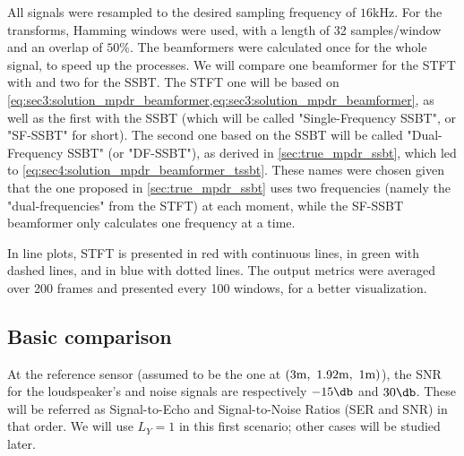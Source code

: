 All signals were resampled to the desired sampling frequency of $16\si{\kilo\hertz}$. For the transforms, Hamming windows were used, with a length of 32 samples/window and an overlap of $50\%$. The beamformers were calculated once for the whole signal, to speed up the processes. We will compare one beamformer for the STFT with and two for the SSBT. The STFT one will be based on \cref{eq:sec3:solution_mpdr_beamformer,eq:sec3:solution_mpdr_beamformer}, as well as the first with the SSBT (which will be called "Single-Frequency SSBT", or "SF-SSBT" for short). The second one based on the SSBT will be called "Dual-Frequency SSBT" (or "DF-SSBT"), as derived in \cref{sec:true_mpdr_ssbt}, which led to \cref{eq:sec4:solution_mpdr_beamformer_tssbt}. These names were chosen given that the one proposed in \cref{sec:true_mpdr_ssbt} uses two frequencies (namely the "dual-frequencies" from the STFT) at each moment, while the SF-SSBT beamformer only calculates one frequency at a time.

In line plots, STFT is presented in red with continuous lines, \nssbt{} in green with dashed lines, and \tssbt{} in blue with dotted lines. The output metrics were averaged over 200 frames and presented every 100 windows, for a better visualization.
%

\subsection{Basic comparison}
At the reference sensor (assumed to be the one at $(3\si{\meter},~1.92\si{\meter},~1\si{\meter})$), the SNR for the loudspeaker's and noise signals are respectively $-15\dB$ and $30\dB$. These will be referred as Signal-to-Echo and Signal-to-Noise Ratios (SER and SNR) in that order. We will use $L_Y = 1$ in this first scenario; other cases will be studied later.%

